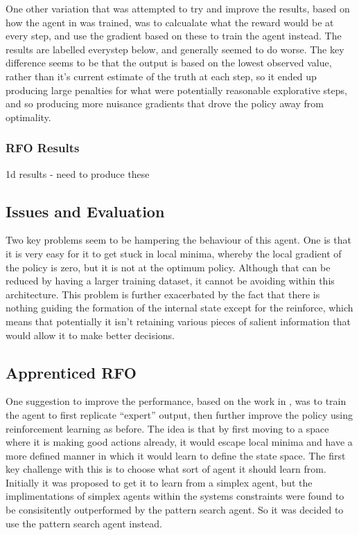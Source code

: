 One other variation that was attempted to try and improve the results, based on how the agent in \cite{RVA} was trained, was to calcualate what the reward would be at every step, and use the gradient based on these to train the agent instead. The results are labelled everystep below, and generally seemed to do worse. The key difference seems to be that the output is based on the lowest observed value, rather than it's current estimate of the truth at each step, so it ended up producing large penalties for what were potentially reasonable explorative steps, and so producing more nuisance gradients that drove the policy away from optimality.

\subsubsection{RFO Results}
1d results  - need to produce these

\subsection{Issues and Evaluation}
Two key problems seem to be hampering the behaviour of this agent. One is that it is very easy for it to get stuck in local minima, whereby the local gradient of the policy is zero, but it is not at the optimum policy. Although that can be reduced by having a larger training dataset, it cannot be avoiding within this architecture. This problem is further exacerbated by the fact that there is nothing guiding the formation of the internal state except for the reinforce, which means that potentially it isn't retaining various pieces of salient information that would allow it to make better decisions.

\subsection{Apprenticed RFO}
One suggestion to improve the performance, based on the work in \cite{alphaGO}, was to train the agent to first replicate ``expert'' output, then further improve the policy using reinforcement learning as before. The idea is that by first moving to a space where it is making good actions already, it would escape local minima and have a more defined manner in which it would learn to define the state space. The first key challenge with this is to choose what sort of agent it should learn from. Initially it was proposed to get it to learn from a simplex agent, but the implimentations of simplex agents within the systems constraints were found to be consisitently outperformed by the pattern search agent. So it was decided to use the pattern search agent instead. 

